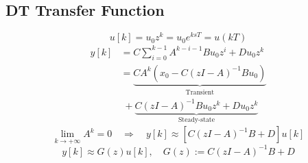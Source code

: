 \subsection{DT Transfer Function}
$$
    u[k] = u_0z^k = u_0e^{ksT} = u(kT)
$$
\begin{align*}
    y[k] &= C\sum_{i=0}^{k-1} A^{k-i-1}Bu_0z^i + Du_0z^k\\
    &= \underbrace{CA^k(x_0-C(zI-A)^{-1}Bu_0)}_{\text{Transient}}\\
    & \; + \underbrace{C(zI-A)^{-1}Bu_0z^k+Du_0z^k}_{\text{Steady-state}}
\end{align*}
$$
    \lim_{k\rightarrow +\infty}A^k = 0 \quad \Rightarrow \quad y[k] \approx [C(zI-A)^{-1}B+D]u[k]
$$
$$
    y[k] \approx G(z)u[k], \quad G(z) := C(zI-A)^{-1}B+D
$$
